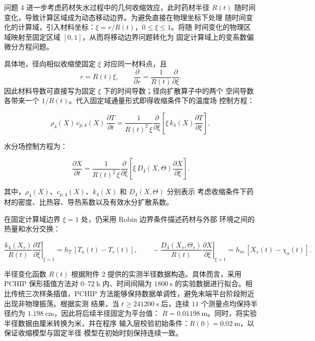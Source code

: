 \documentclass[withoutpreface,bwprint]{cumcmthesis}
\begin{document}
问题 4 进一步考虑药材失水过程中的几何收缩效应，此时药材半径 $R(t)$
随时间变化，导致计算区域成为动态移动边界。为避免直接在物理坐标下处理
随时间变化的计算域，引入材料坐标：$\xi=r/R(t)$，$0\le\xi\le1$。将随
时间变化的物理区域映射至固定区域 $[0,1]$，从而将移动边界问题转化为
固定计算域上的变系数偏微分方程问题。

具体地，径向相似收缩使固定 $\xi$ 对应同一材料点，且
\[
  r=R(t)\xi,\qquad \frac{\partial}{\partial r}
  =\frac{1}{R(t)}\frac{\partial}{\partial\xi}.
\]
因此材料导数可直接写为固定 $\xi$ 下的时间导数；径向扩散算子中的两个
空间导数各带来一个 $1/R(t)$。代入固定域通量形式即得收缩条件下的温度场
控制方程：

\begin{equation}
  \rho_4(X)\,c_{p,4}(X)\,\frac{\partial T}{\partial t}
  =\frac{1}{R(t)^2\,\xi}\frac{\partial}{\partial\xi}
  \left[\xi\,k_4(X)\frac{\partial T}{\partial\xi}\right],
  \label{eq:energy-xi}
\end{equation}

水分场控制方程为：

\begin{equation}
  \frac{\partial X}{\partial t}
  =\frac{1}{R(t)^2\,\xi}\frac{\partial}{\partial\xi}
  \left[\xi\,D_4(X,\Theta)\frac{\partial X}{\partial\xi}\right].
  \label{eq:moisture-xi}
\end{equation}

其中，$\rho_4(X)$、$c_{p,4}(X)$、$k_4(X)$ 和 $D_4(X,\Theta)$ 分别表示
考虑收缩条件下药材的密度、比热容、导热系数以及有效水分扩散系数。

在固定计算域边界 $\xi=1$ 处，仍采用 Robin 边界条件描述药材与外部
环境之间的热量和水分交换：

\begin{equation}
  \frac{k_4(X_s)}{R(t)}
  \left.\frac{\partial T}{\partial\xi}\right|_{\xi=1}
  =h_T\,[T_a(t)-T_s(t)],\qquad
  -\frac{D_4(X_s,\Theta_s)}{R(t)}
  \left.\frac{\partial X}{\partial\xi}\right|_{\xi=1}
  =h_m\,[X_s(t)-\chi_a(t)].
  \label{eq:bc-xi}
\end{equation}

半径变化函数 $R(t)$ 根据附件 2 提供的实测半径数据构造。具体而言，采用
PCHIP 保形插值方法对 $0$--$72\ \mathrm{h}$ 内、时间间隔为
$1800\ \mathrm{s}$ 的实验数据进行拟合。相比传统三次样条插值，PCHIP
方法能够保持数据单调性，避免末端平台阶段附近出现非物理振荡。根据实测
结果，当 $t\ge241200\ \mathrm{s}$ 后，连续 $11$ 个测量点均保持半径约为
$1.198\ \mathrm{cm}$，因此将后续半径固定为平台值：
$R=0.01198\ \mathrm{m}$。同时，将实验半径数据由厘米转换为米，并在程序
输入层校验初始条件：$R(0)=0.02\ \mathrm{m}$，以保证收缩模型与固定半径
模型在初始时刻保持连续一致。
\end{document}
